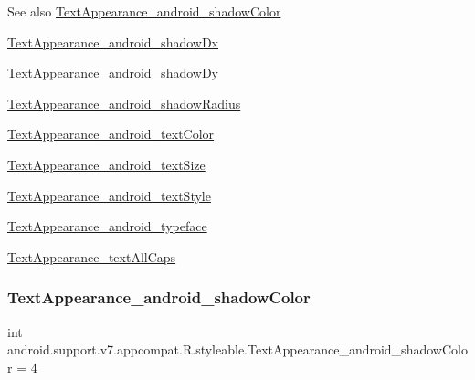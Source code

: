 \begin{DoxySeeAlso}{See also}
\hyperlink{classandroid_1_1support_1_1v7_1_1appcompat_1_1R_1_1styleable_af7af20af0fdcad16682f70d50c5bc466}{Text\+Appearance\+\_\+android\+\_\+shadow\+Color} 

\hyperlink{classandroid_1_1support_1_1v7_1_1appcompat_1_1R_1_1styleable_ac5aa04839a33de4d0ac098bc99edbb61}{Text\+Appearance\+\_\+android\+\_\+shadow\+Dx} 

\hyperlink{classandroid_1_1support_1_1v7_1_1appcompat_1_1R_1_1styleable_a72e9c1ac38f54773710d1ffbaf7b7fdd}{Text\+Appearance\+\_\+android\+\_\+shadow\+Dy} 

\hyperlink{classandroid_1_1support_1_1v7_1_1appcompat_1_1R_1_1styleable_abc79ced8270630311e6bc0c67b718446}{Text\+Appearance\+\_\+android\+\_\+shadow\+Radius} 

\hyperlink{classandroid_1_1support_1_1v7_1_1appcompat_1_1R_1_1styleable_a98071a56321cacaafd32bed6c5659547}{Text\+Appearance\+\_\+android\+\_\+text\+Color} 

\hyperlink{classandroid_1_1support_1_1v7_1_1appcompat_1_1R_1_1styleable_ad99b42fc58cdb8501069528506ff2241}{Text\+Appearance\+\_\+android\+\_\+text\+Size} 

\hyperlink{classandroid_1_1support_1_1v7_1_1appcompat_1_1R_1_1styleable_af5a1023ffeb166c92684b04104b442ac}{Text\+Appearance\+\_\+android\+\_\+text\+Style} 

\hyperlink{classandroid_1_1support_1_1v7_1_1appcompat_1_1R_1_1styleable_a622359cefc99b73e3f85dcbdcac84e1a}{Text\+Appearance\+\_\+android\+\_\+typeface} 

\hyperlink{classandroid_1_1support_1_1v7_1_1appcompat_1_1R_1_1styleable_a7084742635a0a3f3c625dce61434c8d4}{Text\+Appearance\+\_\+text\+All\+Caps} 
\end{DoxySeeAlso}
\mbox{\label{classandroid_1_1support_1_1v7_1_1appcompat_1_1R_1_1styleable_af7af20af0fdcad16682f70d50c5bc466}} 
\subsubsection{\texorpdfstring{Text\+Appearance\+\_\+android\+\_\+shadow\+Color}{TextAppearance\_android\_shadowColor}}
{\footnotesize\ttfamily int android.\+support.\+v7.\+appcompat.\+R.\+styleable.\+Text\+Appearance\+\_\+android\+\_\+shadow\+Color = 4\hspace{0.3cm}{\ttfamily [static]}}

